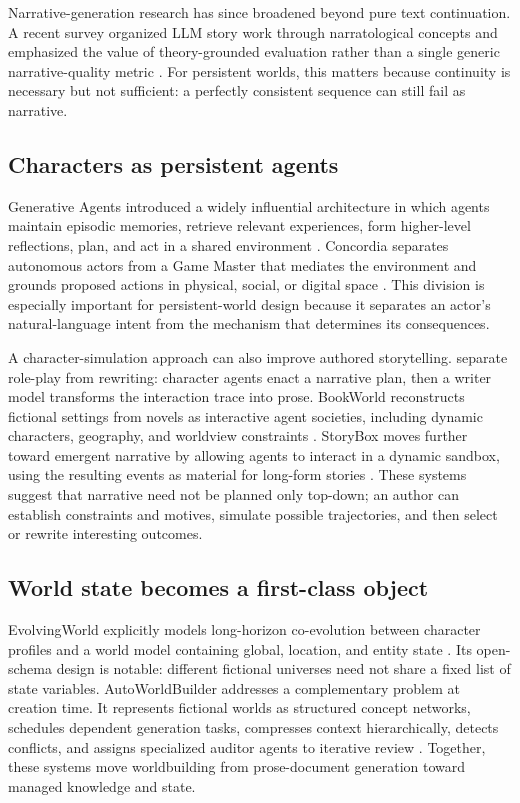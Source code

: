 \documentclass{article}
\begin{document}
Narrative-generation research has since broadened beyond pure text continuation. A recent survey organized LLM story work through narratological concepts and emphasized the value of theory-grounded evaluation rather than a single generic narrative-quality metric \citep{liu2026narrativesurvey}. For persistent worlds, this matters because continuity is necessary but not sufficient: a perfectly consistent sequence can still fail as narrative.

\subsection{Characters as persistent agents}

Generative Agents introduced a widely influential architecture in which agents maintain episodic memories, retrieve relevant experiences, form higher-level reflections, plan, and act in a shared environment \citep{park2023generativeagents}. Concordia separates autonomous actors from a Game Master that mediates the environment and grounds proposed actions in physical, social, or digital space \citep{vezhnevets2023concordia}. This division is especially important for persistent-world design because it separates an actor's natural-language intent from the mechanism that determines its consequences.

A character-simulation approach can also improve authored storytelling. \citet{yu2025charactersimulation} separate role-play from rewriting: character agents enact a narrative plan, then a writer model transforms the interaction trace into prose. BookWorld reconstructs fictional settings from novels as interactive agent societies, including dynamic characters, geography, and worldview constraints \citep{ran2025bookworld}. StoryBox moves further toward emergent narrative by allowing agents to interact in a dynamic sandbox, using the resulting events as material for long-form stories \citep{chen2026storybox}. These systems suggest that narrative need not be planned only top-down; an author can establish constraints and motives, simulate possible trajectories, and then select or rewrite interesting outcomes.

\subsection{World state becomes a first-class object}

EvolvingWorld explicitly models long-horizon co-evolution between character profiles and a world model containing global, location, and entity state \citep{zong2026evolvingworld}. Its open-schema design is notable: different fictional universes need not share a fixed list of state variables. AutoWorldBuilder addresses a complementary problem at creation time. It represents fictional worlds as structured concept networks, schedules dependent generation tasks, compresses context hierarchically, detects conflicts, and assigns specialized auditor agents to iterative review \citep{chen2026worldbuilding}. Together, these systems move worldbuilding from prose-document generation toward managed knowledge and state.
\end{document}
